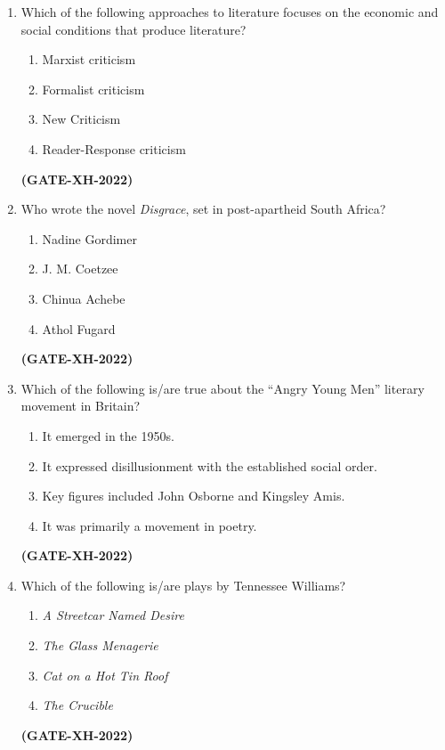 \documentclass[journal]{IEEEtran}
\begin{document}
\begin{enumerate}
\item Which of the following approaches to literature focuses on the economic and social conditions that produce literature?
\begin{multicols}{2}
\begin{enumerate}
\item Marxist criticism
\item Formalist criticism
\item New Criticism
\item Reader-Response criticism
\end{enumerate}
\end{multicols}
\hfill\textbf{(GATE-XH-2022)}

\item Who wrote the novel \textit{Disgrace}, set in post-apartheid South Africa?
\begin{multicols}{2}
\begin{enumerate}
\item Nadine Gordimer
\item J. M. Coetzee
\item Chinua Achebe
\item Athol Fugard
\end{enumerate}
\end{multicols}
\hfill\textbf{(GATE-XH-2022)}

\item Which of the following is/are true about the ``Angry Young Men'' literary movement in Britain?
\begin{enumerate}
\item It emerged in the 1950s.
\item It expressed disillusionment with the established social order.
\item Key figures included John Osborne and Kingsley Amis.
\item It was primarily a movement in poetry.
\end{enumerate}
\hfill\textbf{(GATE-XH-2022)}

\item Which of the following is/are plays by Tennessee Williams?
\begin{multicols}{2}
\begin{enumerate}
\item \textit{A Streetcar Named Desire}
\item \textit{The Glass Menagerie}
\item \textit{Cat on a Hot Tin Roof}
\item \textit{The Crucible}
\end{enumerate}
\end{multicols}
\hfill\textbf{(GATE-XH-2022)}


\end{enumerate}
\end{document}
